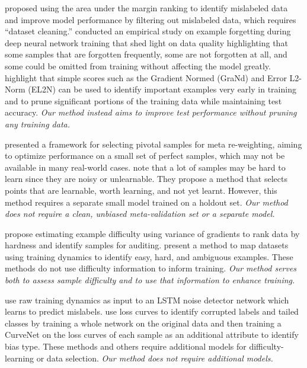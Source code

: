 \documentclass{article}
\theoremstyle{plain}
\theoremstyle{definition}
\theoremstyle{remark}
\begin{document}
\citet{pleiss_identifying_2020} proposed using the area under the margin ranking to identify mislabeled data and improve model performance by filtering out mislabeled data, which requires ``dataset cleaning.''
\citet{toneva2018empirical} conducted an empirical study on example forgetting during deep neural network training that shed light on data quality highlighting that some samples that are forgotten frequently, some are not forgotten at all, and some could be omitted from training without affecting the model greatly. \citet{paul2021deep} highlight that simple scores such as the Gradient Normed (GraNd) and Error L2-Norm (EL2N) can be used to identify important examples very early in training and to prune significant portions of the training data while maintaining test accuracy. \textit{Our method instead aims to improve test performance without pruning any training data.}

\citet{wu_learning_2023} presented a framework for selecting pivotal samples for meta re-weighting, aiming to optimize performance on a small set of perfect samples, which may not be available in many real-world cases. \citet{mindermann_prioritized_2022} note that a lot of samples may be hard to learn since they are noisy or unlearnable. They propose a method that selects points that are learnable, worth learning, and not yet learnt. However, this method requires a separate small model trained on a holdout set. \textit{Our method does not require a clean, unbiased meta-validation set or a separate model.}


\citet{agarwal_estimating_2022} propose estimating example difficulty using variance of gradients to rank data by hardness and identify samples for auditing. \citet{swayamdipta_dataset_2020} present a method to map datasets using training dynamics to identify easy, hard, and ambiguous examples. These methods do not use difficulty information to inform training. \textit{Our method serves both to assess sample difficulty and to use that information to enhance training.}

\citet{jia_learning_2022} use raw training dynamics as input to an LSTM noise detector network which learns to predict mislabels. 
\citet{jiang_delving_2021} use loss curves to identify corrupted labels and tailed classes by training a whole network on the original data and then training a CurveNet on the loss curves of each sample as an additional attribute to identify bias type. These methods and others \citep{dividemix,topological,unicon,combatingsurrogate} require additional models for difficulty-learning or data selection. \textit{Our method does not require additional models.}
\end{document}
